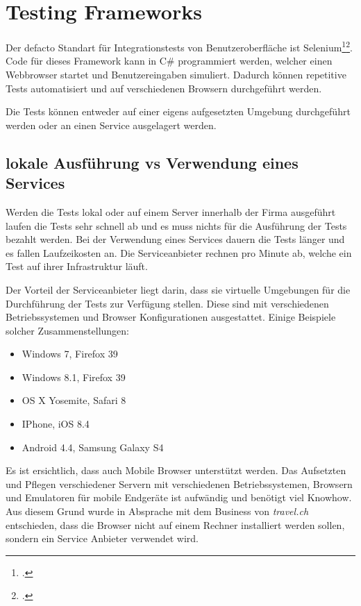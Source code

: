 \section{Testing Frameworks}
\label{sec:Recherche:TestingFrameworks}
Der defacto Standart für Integrationstests von Benutzeroberfläche ist Selenium\footcite{Selenium_-_Web_Browser_Automation_2015-07-26}\footcite{Happy_10th_Birthday_Selenium_ThoughtWorks_2015-07-26}. Code für dieses Framework kann in C\# programmiert werden, welcher einen Webbrowser startet und Benutzereingaben simuliert. Dadurch können repetitive Tests automatisiert und auf verschiedenen Browsern durchgeführt werden.

Die Tests können entweder auf einer eigens aufgesetzten Umgebung durchgeführt werden oder an einen Service ausgelagert werden.

\subsection{lokale Ausführung vs Verwendung eines Services}
\label{sec:Recherche:TestingFrameworks:vs}
Werden die Tests lokal oder auf einem Server innerhalb der Firma ausgeführt laufen die Tests sehr schnell ab und es muss nichts für die Ausführung der Tests bezahlt werden. Bei der Verwendung eines Services dauern die Tests länger und es fallen Laufzeikosten an. Die Serviceanbieter rechnen pro Minute ab, welche ein Test auf ihrer Infrastruktur läuft.

Der Vorteil der Serviceanbieter liegt darin, dass sie virtuelle Umgebungen für die Durchführung der Tests zur Verfügung stellen. Diese sind mit verschiedenen Betriebssystemen und Browser Konfigurationen ausgestattet. Einige Beispiele solcher Zusammenstellungen:
\begin{itemize}
\item Windows 7, Firefox 39
\item Windows 8.1, Firefox 39
\item OS X Yosemite, Safari 8
\item IPhone, iOS 8.4
\item Android 4.4, Samsung Galaxy S4
\end{itemize}
Es ist ersichtlich, dass auch Mobile Browser unterstützt werden. Das Aufsetzten und Pflegen verschiedener Servern mit verschiedenen Betriebssystemen, Browsern und Emulatoren für mobile Endgeräte ist aufwändig und benötigt viel Knowhow. Aus diesem Grund wurde in Absprache mit dem Business von \textit{travel.ch} entschieden, dass die Browser nicht auf einem Rechner installiert werden sollen, sondern ein Service Anbieter verwendet wird.

